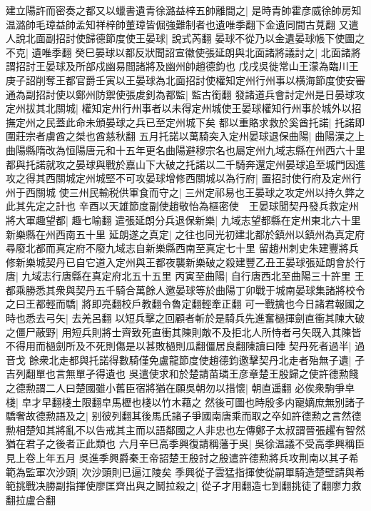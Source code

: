 建立陽許而密奏之都又以蠟書遺青徐潞益梓五帥離間之|{
	是時青帥霍彦威徐帥房知温潞帥毛璋益帥孟知祥梓帥董璋皆倔強難制者也遺唯季翻下金遺同間古莧翻}
又遣人說北面副招討使歸德節度使王晏球|{
	說式芮翻}
晏球不從乃以金遺晏球帳下使圖之不克|{
	遺唯季翻}
癸巳晏球以都反狀聞詔宣徽使張延朗與北面諸將議討之|{
	北面諸將謂招討王晏球及所部戍幽易間諸將及幽州帥趙德鈞也}
戊戌吳徙常山王濛為臨川王　庚子詔削奪王都官爵壬寅以王晏球為北面招討使權知定州行州事以横海節度使安審通為副招討使以鄭州防禦使張䖍釗為都監|{
	監古銜翻}
發諸道兵會討定州是日晏球攻定州拔其北關城|{
	權知定州行州事者以未得定州城使王晏球權知行州事於城外以招撫定州之民蓋此命未頒晏球之兵已至定州城下矣}
都以重賂求救於奚酋托諾|{
	托諾即圍莊宗者虜酋之桀也酋慈秋翻}
五月托諾以萬騎突入定州晏球退保曲陽|{
	曲陽漢之上曲陽縣隋改為恒陽唐元和十五年更名曲陽避穆宗名也屬定州九域志縣在州西六十里}
都與托諾就攻之晏球與戰於嘉山下大破之托諾以二千騎奔還定州晏球追至城門因進攻之得其西關城定州城堅不可攻晏球增修西關城以為行府|{
	置招討使行府及定州行州于西關城}
使三州民輸税供軍食而守之|{
	三州定祁易也王晏球之攻定州以持久弊之此其先定之計也}
辛酉以天雄節度副使趙敬怡為樞密使　王晏球聞契丹發兵救定州將大軍趣望都|{
	趣七喻翻}
遣張延朗分兵退保新樂|{
	九域志望都縣在定州東北六十里新樂縣在州西南五十里}
延朗遂之真定|{
	之往也同光初建北都於鎮州以鎮州為真定府尋廢北都而真定府不廢九域志自新樂縣西南至真定七十里}
留趙州刺史朱建豐將兵修新樂城契丹已自它道入定州與王都夜襲新樂破之殺建豐乙丑王晏球張延朗會於行唐|{
	九域志行唐縣在真定府北五十五里}
丙寅至曲陽|{
	自行唐西北至曲陽三十許里}
王都乘勝悉其衆與契丹五千騎合萬餘人邀晏球等於曲陽丁卯戰于城南晏球集諸將校令之曰王都輕而驕|{
	將即亮翻校戶教翻令魯定翻輕牽正翻}
可一戰擒也今日諸君報國之時也悉去弓矢|{
	去羌呂翻}
以短兵擊之回顧者斬於是騎兵先進奮檛揮劍直衝其陳大破之僵尸蔽野|{
	用短兵則將士齊致死直衝其陳則敵不及拒北人所恃者弓矢既入其陳皆不得用而檛劍所及不死則傷是以甚敗檛則瓜翻僵居良翻陳讀曰陣}
契丹死者過半|{
	過音戈}
餘衆北走都與托諾得數騎僅免盧龍節度使趙德鈞邀擊契丹北走者殆無子遺|{
	孑吉列翻單也言無單孑得遺也}
吳遣使求和於楚請苗璘王彦章楚王殷歸之使許德勲餞之德勲謂二人曰楚國雖小舊臣宿將猶在願吳朝勿以措懷|{
	朝直遥翻}
必俟衆駒爭皁棧|{
	皁才早翻棧土限翻皁馬櫪也棧以竹木藉之}
然後可圖也時殷多内寵嫡庶無别諸子驕奢故德勲語及之|{
	别彼列翻其後馬氏諸子爭國南唐乘而取之卒如許德勲之言然德勲相楚知其將亂不以告戒其主而以語鄰國之人非忠也左傳鄭子太叔謂晉張趯有智然猶在君子之後者正此類也}
六月辛巳高季興復請稱藩于吳|{
	吳徐温議不受高季興稱臣見上卷上年五月}
吳進季興爵秦王帝詔楚王殷討之殷遣許德勲將兵攻荆南以其子希範為監軍次沙頭|{
	次沙頭則已逼江陵矣}
季興從子雲猛指揮使從嗣單騎造楚壁請與希範挑戰决勝副指揮使廖匡齊出與之鬭拉殺之|{
	從子才用翻造七到翻挑徒了翻廖力救翻拉盧合翻}
